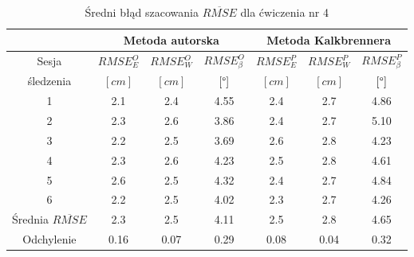 \begin{table}[!htb]
	\caption{Średni błąd szacowania $\overline{RMSE}$ dla ćwiczenia nr 4}
	\label{tab:experiments:four:avg}
	\noindent
	\tiny
	\centering
	\begin{tabular}{|c|c|c|c|c|c|c|}
		\hline 
		& \multicolumn{3}{c|}{Metoda autorska} & \multicolumn{3}{c|}{Metoda Kalkbrennera}  \\ 
		\hline 
		Sesja                      & $RMSE^O_E$ & $RMSE^O_W$ & $RMSE^O_\beta$ & $RMSE^P_E$ & $RMSE^P_W$ & $RMSE^P_\beta$ \\
		śledzenia                 & $[cm]$     & $[cm]$     & $[\degree]$    & $[cm]$     & $[cm]$     & $[\degree]$    \\	
		\hline
		1                          & 2.1        & 2.4        & 4.55           & 2.4        & 2.7        & 4.86           \\
		2                          & 2.3        & 2.6        & 3.86           & 2.4        & 2.7        & 5.10           \\
		3                          & 2.2        & 2.5        & 3.69           & 2.6        & 2.8        & 4.23           \\
		4                          & 2.3        & 2.6        & 4.23           & 2.5        & 2.8        & 4.61           \\
		5                          & 2.6        & 2.5        & 4.32           & 2.4        & 2.7        & 4.84           \\
		6                          & 2.2        & 2.5        & 4.02           & 2.3        & 2.7        & 4.26           \\
		\hline
																		
		Średnia $\overline{RMSE}$ & 2.3        & 2.5        & 4.11           & 2.5        & 2.8        & 4.65           \\
		Odchylenie                 & 0.16       & 0.07       & 0.29           & 0.08       & 0.04       & 0.32           \\
		\hline
	\end{tabular} 
								
\end{table} 

